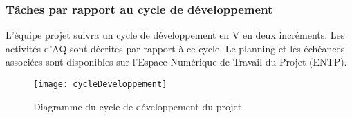 \documentclass[a4paper,11pt,titlepage]{article}
\begin{document}
\subsubsection{Tâches par rapport au cycle de développement} %
L'équipe projet suivra un cycle de développement en V en deux incréments. Les activités d'AQ sont décrites par rapport à ce cycle. Le planning et les échéances associées sont disponibles sur l'Espace Numérique de Travail du Projet (ENTP). \\

\bigskip


\begin{figure}[H]
    \centering
    \texttt{[image: cycleDeveloppement]}
    \caption{Diagramme du cycle de développement du projet}
\end{figure}
\end{document}
